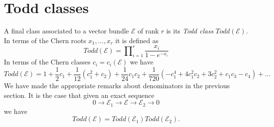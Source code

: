 \section{Todd classes}
\label{section-todd-classes}

\noindent
A final class associated to a vector bundle $\mathcal{E}$
of rank $r$ is its {\it Todd class} $Todd(\mathcal{E})$.
In terms of the Chern roots $x_1, \ldots, x_r$ it is
defined as
$$
Todd(\mathcal{E})
=
\prod\nolimits_{i = 1}^r
\frac{x_i}{1 - e^{-x_i}}
$$
In terms of the Chern classes $c_i = c_i(\mathcal{E})$
we have
$$
Todd(\mathcal{E})
=
1
+
\frac{1}{2}c_1
+
\frac{1}{12}(c_1^2 + c_2)
+
\frac{1}{24}c_1c_2
+
\frac{1}{720}(-c_1^4 + 4c_1^2c_2 + 3c_2^2 + c_1c_3 - c_4)
+
\ldots
$$
We have made the appropriate remarks about denominators
in the previous section. It is the case that
given an exact sequence
$$
0
\to
{\mathcal E}_1
\to
{\mathcal E}
\to
{\mathcal E}_2
\to
0
$$
we have
$$
Todd({\mathcal E}) = Todd({\mathcal E}_1) Todd({\mathcal E}_2).
$$







